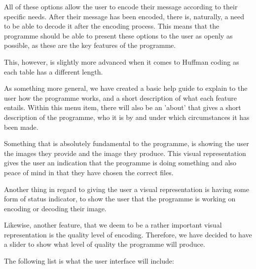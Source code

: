 All of these options allow the user to encode their message according to their specific needs.
After their message has been encoded, there is, naturally, a need to be able to decode it after the encoding process.
This means that the programme should be able to present these options to the user as openly as possible, as these are the key features of the programme.

This, however, is slightly more advanced when it comes to Huffman coding as each table has a different length.

As something more general, we have created a basic help guide to explain to the user how the programme works, and a short description of what each feature entails.
Within this menu item, there will also be an 'about' that gives a short description of the programme, who it is by and under which circumstances it has been made.

Something that is absolutely fundamental to the programme, is showing the user the images they provide and the image they produce.
This visual representation gives the user an indication that the programme is doing something and also peace of mind in that they have chosen the correct files.

Another thing in regard to giving the user a visual representation is having some form of status indicator, to show the user that the programme is working on encoding or decoding their image.

Likewise, another feature, that we deem to be a rather important visual representation is the quality level of encoding.
Therefore, we have decided to have a slider to show what level of quality the programme will produce.

The following list is what the user interface will include:

